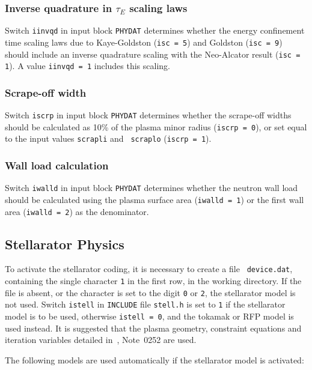 \documentclass[11pt,a4paper]{report}
\begin{document}
\subsubsection{Inverse quadrature in $\tau_E$ scaling laws}

Switch {\tt iinvqd} in input block {\tt PHYDAT} determines whether the energy
confinement time scaling laws due to Kaye-Goldston ({\tt isc = 5}) and
Goldston ({\tt isc = 9}) should include an inverse quadrature scaling with the
Neo-Alcator result ({\tt isc = 1}). A value {\tt iinvqd = 1} includes this
scaling.

\subsubsection{Scrape-off width}

Switch {\tt iscrp} in input block {\tt PHYDAT} determines whether the
scrape-off widths should be calculated as 10\% of the plasma minor radius
({\tt iscrp = 0}), or set equal to the input values {\tt scrapli} and {\tt
scraplo} ({\tt iscrp = 1}).

\subsubsection{Wall load calculation}

Switch {\tt iwalld} in input block {\tt PHYDAT} determines whether the neutron
wall load should be calculated using the plasma surface area ({\tt iwalld =
1}) or the first wall area ({\tt iwalld = 2}) as the denominator.

\subsection{Stellarator Physics}

To activate the stellarator coding, it is necessary to create a file {\tt
device.dat}, containing the single character {\tt 1} in the first row, in the
working directory. If the file is absent, or the character is set to the digit
{\tt 0} or {\tt 2}, the stellarator model is not used. Switch {\tt istell} in
{\tt INCLUDE} file {\tt stell.h} is set to {\tt 1} if the stellarator model is
to be used, otherwise {\tt istell = 0}, and the tokamak or RFP model is used
instead.  It is suggested that the plasma geometry, constraint equations and
iteration variables detailed in~\cite{PWF}, Note~0252 are used.
\setlength{\parskip}{5mm}

The following models are used automatically if the stellarator model is
activated:
\setlength{\parskip}{0mm}
\end{document}
